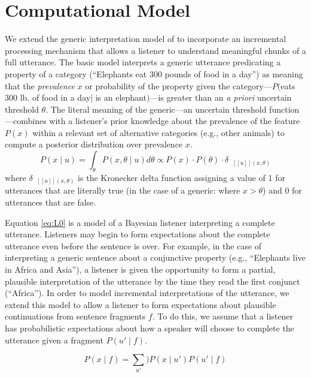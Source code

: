 \documentclass[10pt,letterpaper]{article}
\newcommand{\denote}[1]{\mbox{ $[\![ #1 ]\!]$}}
\begin{document}
\section{Computational Model}

We extend the generic interpretation model of  to incorporate an incremental processing mechanism that allows a listener to understand meaningful chunks of a full utterance.
The basic model interprets a generic utterance predicating a property of a category (``Elephants eat 300 pounds of food in a day'') as meaning that the \emph{prevalence} $x$ or probability of the property given the category---$P($eats 300 lb. of food in a day$\mid$ is an elephant$)$---is greater than an \emph{a priori} uncertain threshold $\theta$. 
The literal meaning of the generic---an uncertain threshold function---combines with a listener's prior knowledge about the prevalence of the feature $P(x)$ within a relevant set of alternative categories (e.g., other animals) to compute a posterior distribution over prevalence $x$. 
\begin{equation}
P(x \mid u) = \int_{\theta} P(x, \theta \mid u)  d\theta \propto P(x) \cdot P(\theta) \cdot \delta_{\denote{u}(x, \theta)} 
\label{eq:L0}
\end{equation}
\noindent where $\delta_{\denote{u}(x, \theta)}$ is the Kronecker delta function assigning a value of 1 for utterances that are literally true (in the case of a generic: where $x > \theta$) and 0 for utterances that are false.

Equation \ref{eq:L0} is a model of a Bayesian listener interpreting a complete utterance.
Listeners may begin to form expectations about the complete utterance even before the sentence is over. 
For example, in the case of interpreting a generic sentence about a conjunctive property (e.g., ``Elephants live in Africa and Asia''), a listener is given the opportunity to form a partial, plausible interpretation of the utterance by the time they read the first conjunct (``Africa''). 
In order to model incremental interpretations of the utterance, we extend this model to allow a listener to form expectations about plausible continuations from sentence fragments $f$.
To do this, we assume that a listener has probabilistic expectations about how a speaker will choose to complete the utterance given a fragment $P(u' \mid f)$.

\begin{equation}
P(x \mid f) = \sum_{u'}) P(x \mid u') P(u' \mid f) 
\label{eq:L0a}
\end{equation}
\end{document}
